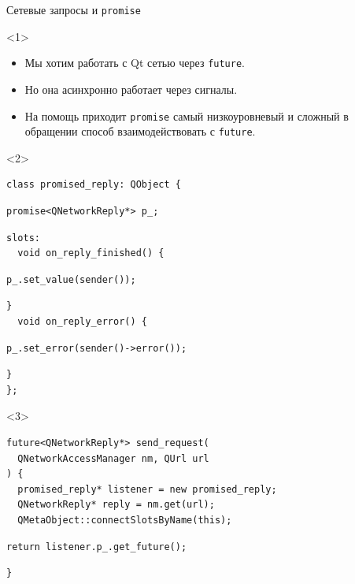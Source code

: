 \documentclass[aspectratio=169,hyperref={unicode},17pt]{beamer}
\begin{document}
\begin{frame}[fragile,t]{Сетевые запросы и \texttt{promise}}
\begin{onlyenv}<1>
\begin{itemize}
 \item Мы хотим работать с Qt сетью через \texttt{future}.
 \item Но она асинхронно работает через сигналы.
 \item На помощь приходит \texttt{promise} самый низкоуровневый и сложный в обращении способ взаимодействовать с \texttt{future}.
\end{itemize}
\end{onlyenv}
\begin{onlyenv}<2>
\begin{lstlisting}[style=cppcode,aboveskip=0pt,belowskip=0pt]
class promised_reply: QObject {
\end{lstlisting}
\begin{lstlisting}[style=cppcode,backgroundcolor=\color{gray!30},aboveskip=0pt,belowskip=0pt]
  promise<QNetworkReply*> p_;
\end{lstlisting}
\begin{lstlisting}[style=cppcode,aboveskip=0pt,belowskip=0pt]
slots:
  void on_reply_finished() {
\end{lstlisting}
\begin{lstlisting}[style=cppcode,backgroundcolor=\color{gray!30},aboveskip=0pt,belowskip=0pt]
    p_.set_value(sender());
\end{lstlisting}
\begin{lstlisting}[style=cppcode,aboveskip=0pt,belowskip=0pt]
  }
  void on_reply_error() {
\end{lstlisting}
\begin{lstlisting}[style=cppcode,backgroundcolor=\color{gray!30},aboveskip=0pt,belowskip=0pt]
    p_.set_error(sender()->error());
\end{lstlisting}
\begin{lstlisting}[style=cppcode,aboveskip=0pt,belowskip=0pt]
  }
};
\end{lstlisting}
\end{onlyenv}
\begin{onlyenv}<3>
\begin{lstlisting}[style=cppcode,aboveskip=0pt,belowskip=0pt]
future<QNetworkReply*> send_request(
  QNetworkAccessManager nm, QUrl url
) {
  promised_reply* listener = new promised_reply;
  QNetworkReply* reply = nm.get(url);
  QMetaObject::connectSlotsByName(this);
\end{lstlisting}
\begin{lstlisting}[style=cppcode,backgroundcolor=\color{gray!30},aboveskip=0pt,belowskip=0pt]
  return listener.p_.get_future();
\end{lstlisting}
\begin{lstlisting}[style=cppcode,aboveskip=0pt,belowskip=0pt]
}
\end{lstlisting}
\end{onlyenv}
\end{frame}
\end{document}
